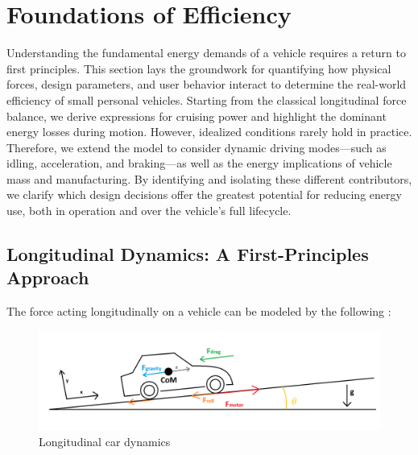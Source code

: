 \section{Foundations of Efficiency}
Understanding the fundamental energy demands of a vehicle requires a return to first principles. This section lays the groundwork for quantifying how physical forces, design parameters, and user behavior interact to determine the real-world efficiency of small personal vehicles. Starting from the classical longitudinal force balance, we derive expressions for cruising power and highlight the dominant energy losses during motion. However, idealized conditions rarely hold in practice. Therefore, we extend the model to consider dynamic driving modes—such as idling, acceleration, and braking—as well as the energy implications of vehicle mass and manufacturing. By identifying and isolating these different contributors, we clarify which design decisions offer the greatest potential for reducing energy use, both in operation and over the vehicle’s full lifecycle.
\subsection{Longitudinal Dynamics: A First-Principles Approach}
The force acting longitudinally on a vehicle can be modeled by the following : 

\begin{figure}[h!]
    \centering
    \includegraphics[width=1\linewidth]{Figures/ch1_ForceAxis.png}
    \caption{Longitudinal car dynamics}
    \label{fig:longcardynamics}
\end{figure}

